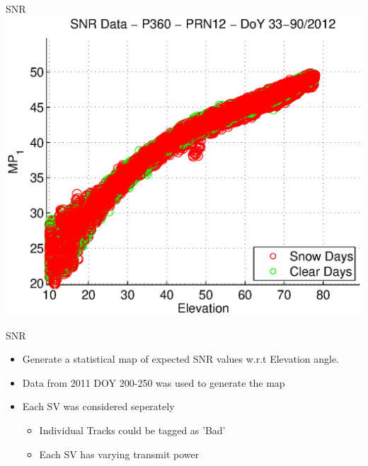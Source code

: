 \documentclass{beamer}
\begin{document}
\section[SNR]{}
\begin{frame}{SNR}
  \includegraphics[width=1\linewidth,clip=true]{snr_p360_prn12.eps}
\end{frame}

\begin{frame}{SNR}
  \begin{itemize}
  \item Generate a statistical map of expected SNR values w.r.t Elevation angle.
  \item Data from 2011 DOY 200-250 was used to generate the map
  \item Each SV was considered seperately
    \begin{itemize}
    \item Individual Tracks could be tagged as 'Bad'
    \item Each SV has varying transmit power
    \end{itemize}
  \end{itemize}
\end{frame}
\end{document}
